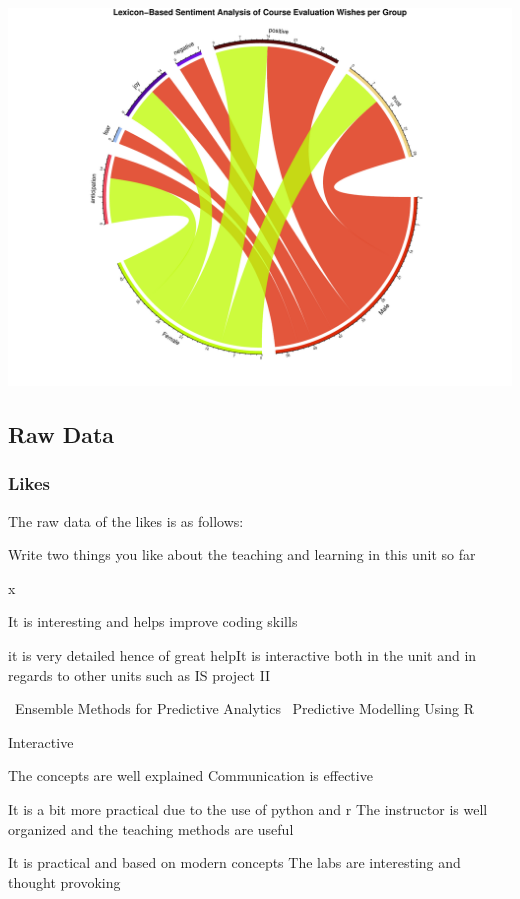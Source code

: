 \documentclass[
]{article}
\begin{document}
\includegraphics{AnalysisOfCourseEvaluation-Notebook_files/figure-latex/ChordDiagramPerGender_Wishes-1.pdf}

\newpage

\subsection{Raw Data}\label{raw-data}

\subsubsection{Likes}\label{likes}

The raw data of the likes is as follows:

Write two things you like about the teaching and learning in this unit
so far

x

It is interesting and helps improve coding skills

it is very detailed hence of great helpIt is interactive both in the
unit and in regards to other units such as IS project II

~Ensemble Methods for Predictive Analytics~ Predictive Modelling Using
R~

Interactive

The concepts are well explained Communication is effective~

It is a bit more practical due to the use of python and r The instructor
is well organized and the teaching methods are useful

It is practical and based on modern concepts The labs are interesting
and thought provoking
\end{document}
